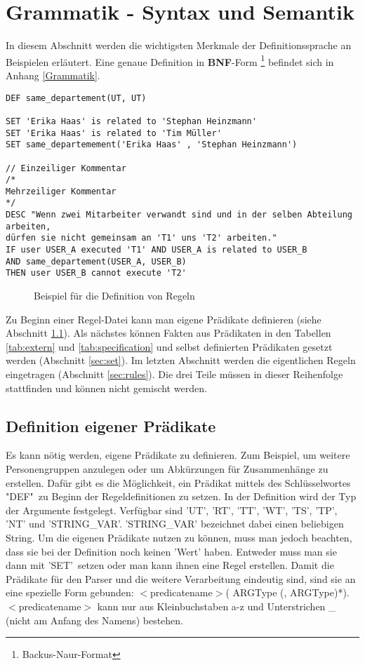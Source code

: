 \section{Grammatik - Syntax und Semantik}
In diesem Abschnitt werden die wichtigsten Merkmale der Definitionssprache an Beispielen erläutert. Eine genaue Definition in \textbf{BNF}-Form \footnote{Backus-Naur-Format} befindet sich in Anhang \ref{Grammatik}.
\begin{verbatim}
DEF same_departement(UT, UT)

SET 'Erika Haas' is related to 'Stephan Heinzmann'
SET 'Erika Haas' is related to 'Tim Müller'
SET same_departemement('Erika Haas' , 'Stephan Heinzmann')

// Einzeiliger Kommentar
/*
Mehrzeiliger Kommentar
*/
DESC "Wenn zwei Mitarbeiter verwandt sind und in der selben Abteilung arbeiten,
dürfen sie nicht gemeinsam an 'T1' uns 'T2' arbeiten."
IF user USER_A executed 'T1' AND USER_A is related to USER_B 
AND same_departement(USER_A, USER_B)
THEN user USER_B cannot execute 'T2'
\end{verbatim}
\begin{figure}[!h]
\caption{Beispiel für die Definition von Regeln}
\label{fig:absolute}
\end{figure}

Zu Beginn einer Regel-Datei kann man eigene Prädikate definieren (siehe Abschnitt \ref{sec:define}). Als nächstes können Fakten aus Prädikaten in den Tabellen \ref{tab:extern} und \ref{tab:specification} und selbst definierten Prädikaten gesetzt werden (Abschnitt \ref{sec:set}). Im letzten Abschnitt werden die eigentlichen Regeln eingetragen (Abschnitt \ref{sec:rules}). Die drei Teile müssen in 
dieser Reihenfolge stattfinden und können nicht gemischt werden. 

%
%

\subsection{Definition eigener Prädikate}
\label{sec:define}
Es kann nötig werden, eigene Prädikate zu definieren. Zum Beispiel, um weitere Personengruppen anzulegen oder um Abkürzungen für Zusammenhänge zu erstellen. Dafür gibt es die Möglichkeit, ein Prädikat mittels des Schlüsselwortes "DEF"\ zu Beginn der Regeldefinitionen zu setzen. In der Definition wird der Typ der Argumente festgelegt. Verfügbar sind 'UT', 'RT', 'TT', 'WT', 'TS', 'TP', 'NT' und 'STRING\_VAR'. 'STRING\_VAR' bezeichnet dabei einen beliebigen String.
Um die eigenen Prädikate nutzen zu können, muss man jedoch beachten, dass sie bei der Definition noch keinen 'Wert' haben. Entweder muss man sie dann mit 'SET'\ setzen oder man kann ihnen eine Regel erstellen. Damit die Prädikate für den Parser und die weitere Verarbeitung eindeutig sind, sind sie an eine spezielle Form gebunden: $<$predicatename$>$( ARGType (, ARGType)*). $<$predicatename$>$ kann nur aus Kleinbuchstaben a-z und Unterstrichen \_ (nicht am Anfang des Namens) bestehen.

